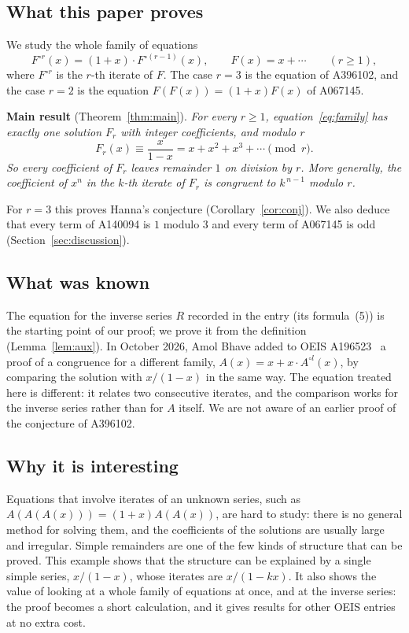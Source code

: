\documentclass[11pt,a4paper]{article}
\theoremstyle{definition}
\theoremstyle{remark}
\begin{document}
\subsection{What this paper proves}
We study the whole family of equations
\begin{equation}\label{eq:family}
F^{\circ r}(x)=(1+x)\cdot F^{\circ(r-1)}(x),\qquad F(x)=x+\cdots\qquad(r\ge1),
\end{equation}
where $F^{\circ r}$ is the $r$-th iterate of $F$. The case $r=3$ is the equation of A396102, and the case $r=2$ is the
equation $F(F(x))=(1+x)F(x)$ of A067145.

\textbf{Main result} (Theorem~\ref{thm:main}). \emph{For every $r\ge1$, equation~\eqref{eq:family} has exactly one
solution $F_r$ with integer coefficients, and modulo $r$}
\[
F_r(x)\equiv\frac{x}{1-x}=x+x^2+x^3+\cdots\pmod r .
\]
\emph{So every coefficient of $F_r$ leaves remainder $1$ on division by $r$. More generally, the coefficient of $x^n$ in
the $k$-th iterate of $F_r$ is congruent to $k^{\,n-1}$ modulo $r$.}

For $r=3$ this proves Hanna's conjecture (Corollary~\ref{cor:conj}). We also deduce that every term of A140094 is
$1$ modulo $3$ and every term of A067145 is odd (Section~\ref{sec:discussion}).

\subsection{What was known}
The equation for the inverse series $R$ recorded in the entry (its formula~(5)) is the starting point of our proof; we
prove it from the definition (Lemma~\ref{lem:aux}). In October 2026, Amol Bhave added to OEIS A196523~\cite{oeisB} a
proof of a congruence for a different family, $A(x)=x+x\cdot A^{\circ l}(x)$, by comparing the solution with
$x/(1-x)$ in the same way. The equation treated here is different: it relates two consecutive iterates, and the
comparison works for the inverse series rather than for $A$ itself. We are not aware of an earlier proof of the
conjecture of A396102.

\subsection{Why it is interesting}
Equations that involve iterates of an unknown series, such as $A(A(A(x)))=(1+x)A(A(x))$, are hard to study: there is
no general method for solving them, and the coefficients of the solutions are usually large and irregular. Simple
remainders are one of the few kinds of structure that can be proved. This example shows that the structure can be
explained by a single simple series, $x/(1-x)$, whose iterates are $x/(1-kx)$. It also shows the value of looking at a
whole family of equations at once, and at the inverse series: the proof becomes a short calculation, and it gives
results for other OEIS entries at no extra cost.
\end{document}
